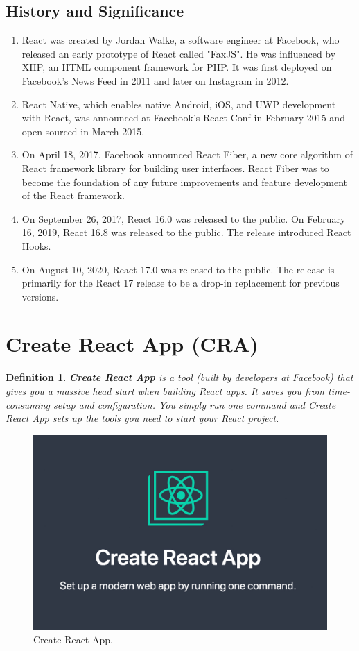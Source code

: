 \documentclass[11pt]{article}
\newtheorem{dfn}[thm]{Definition}
\begin{document}
\subsection{History and Significance}
\begin{enumerate}
    \item React was created by Jordan Walke, a software engineer at Facebook, who released an early prototype of React called "FaxJS". He was influenced by XHP, an HTML component framework for PHP. It was first deployed on Facebook's News Feed in 2011 and later on Instagram in 2012.
    \item React Native, which enables native Android, iOS, and UWP development with React, was announced at Facebook's React Conf in February 2015 and open-sourced in March 2015.
    \item On April 18, 2017, Facebook announced React Fiber, a new core algorithm of React framework library for building user interfaces. React Fiber was to become the foundation of any future improvements and feature development of the React framework.
    \item On September 26, 2017, React 16.0 was released to the public. On February 16, 2019, React 16.8 was released to the public. The release introduced React Hooks.
    \item On August 10, 2020, React 17.0 was released to the public. The release is primarily for the React 17 release to be a drop-in replacement for previous versions.
\end{enumerate}

\section{Create React App (CRA)}

\begin{dfn}
    \textbf{Create React App} is a tool (built by developers at Facebook) that gives you a massive head start when building React apps. It saves you from time-consuming setup and configuration. You simply run one command and Create React App sets up the tools you need to start your React project.
\end{dfn}

\begin{figure}[H]
    \centering
    \includegraphics[width=.75\textwidth]{create-react-app/create-react-app_2.jpg}
    \caption{Create React App. }
\end{figure}
\end{document}
